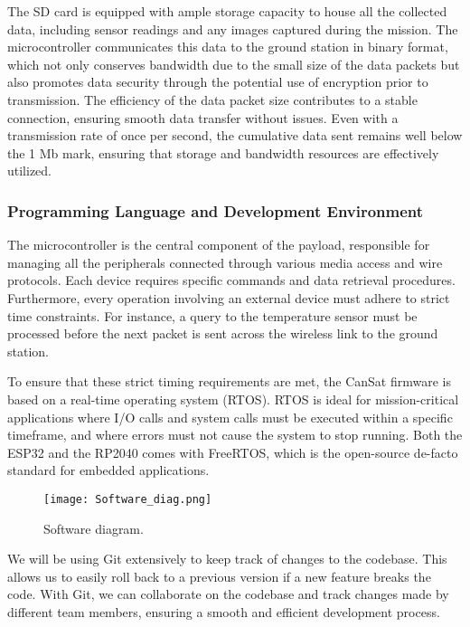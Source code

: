 The SD card is equipped with ample storage capacity to house all the collected data, including sensor readings and any images captured during the mission. The microcontroller communicates this data to the ground station in binary format, which not only conserves bandwidth due to the small size of the data packets but also promotes data security through the potential use of encryption prior to transmission. The efficiency of the data packet size contributes to a stable connection, ensuring smooth data transfer without issues. Even with a transmission rate of once per second, the cumulative data sent remains well below the 1 Mb mark, ensuring that storage and bandwidth resources are effectively utilized.

\subsubsection{Programming Language and Development Environment}

The microcontroller is the central component of the payload, responsible for managing all the peripherals connected through various media access and wire protocols. Each device requires specific commands and data retrieval procedures. Furthermore, every operation involving an external device must adhere to strict time constraints. For instance, a query to the temperature sensor must be processed before the next packet is sent across the wireless link to the ground station.

To ensure that these strict timing requirements are met, the CanSat firmware is based on a real-time operating system (RTOS). RTOS is ideal for mission-critical applications where I/O calls and system calls must be executed within a specific timeframe, and where errors must not cause the system to stop running. Both the ESP32 and the RP2040 comes with FreeRTOS, which is the open-source de-facto standard for embedded applications.
\begin{figure}[htbp]
    \centering
    \texttt{[image: Software\_diag.png]}
    \caption{\small{Software diagram.}}
    \label{fig:codeblocks}
\end{figure}

We will be using Git extensively to keep track of changes to the codebase. This allows us to easily roll back to a previous version if a new feature breaks the code. With Git, we can collaborate on the codebase and track changes made by different team members, ensuring a smooth and efficient development process.

